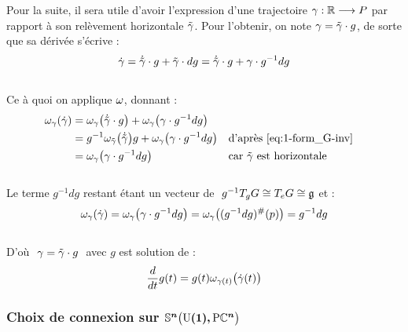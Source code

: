 Pour la suite, il sera utile d'avoir l'expression d'une trajectoire $\gamma:\mathbb{R}\longrightarrow P$ par rapport à son relèvement horizontale $\Tilde{\gamma}$. Pour l'obtenir, on note  $\gamma = \Tilde{\gamma}\cdot g$, de sorte que sa dérivée s'écrive :
\[\dot{\gamma} = \dot{\Tilde{\gamma}}\cdot g + \Tilde{\gamma}\cdot dg = \dot{\Tilde{\gamma}}\cdot g + \gamma \cdot g^{-1}dg\]
\\
Ce à quoi on applique $\omega$, donnant :
\begin{align*}
	\omega_\gamma(\dot{\gamma}) &= \omega_\gamma\big( \dot{\Tilde{\gamma}}\cdot g \big) + \omega_\gamma \big( \gamma \cdot g^{-1}dg \big) \\
	&= g^{-1}\omega_{\Tilde{\gamma}}\big(\dot{\Tilde{\gamma}} \big) g + \omega_\gamma \big( \gamma \cdot g^{-1}dg \big)   &  &\text{d'après \eqref{eq:1-form_G-inv}} \\
	&= \omega_\gamma \big( \gamma \cdot g^{-1}dg \big)  &  &\text{car $\Tilde{\gamma}$ est horizontale}
\end{align*}
\\
Le terme $g^{-1}dg$ restant étant un vecteur de $\ g^{-1}\tg[g]{G}\cong \tg[e]{G}\cong \mathfrak{g}$ et :
\[\omega_\gamma(\dot{\gamma}) = \omega_\gamma \big( \gamma \cdot g^{-1}dg \big) = \omega_\gamma \big( (g^{-1}dg)^\#(p) \big) = g^{-1}dg\]
\\
D'où $\ \gamma = \Tilde{\gamma}\cdot g\ $ avec $g$ est solution de :
\begin{equation} \label{eq:deviation2hozi}
	\frac{d}{dt}g(t)  = g(t) \omega_{\gamma(t)}\big( \dot{\gamma}(t) \big)
\end{equation}
\skipl



\subsubsection{Choix de connexion sur $\boldsymbol{\mathbb{ S}^{n}\big(\text{\normalfont U}(1),\text{\normalfont P}\mathbb{C}^{n}\big)}$}\label{subsec:conn2SUPC}

